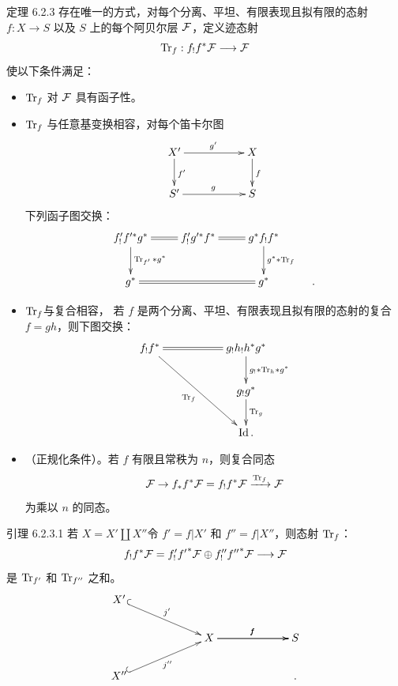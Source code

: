 \begin{enonce*}{定理 6.2.3}
存在唯一的方式，对每个分离、平坦、有限表现且拟有限的态射 $f:X\rightarrow S$
以及 $S$ 上的每个阿贝尔层 ${\mathcal F} $，定义迹态射
$$
\operatorname{Tr}_{f}:f_{!}f^{\ast}{\mathcal F} \longrightarrow {\mathcal F}
$$
使以下条件满足：
\begin{itemize}
\item[\textsuperscript{(Var 1)}] $\operatorname{Tr}_{f}$ 对 ${\mathcal F} $ 具有函子性。

\item[\textsuperscript{(Var 2)}] $\operatorname{Tr}_{f}$ 与任意基变换相容，\ie 对每个笛卡尔图
$$
\xymatrix{
X' \ar[rr]^{g'} \ar[d]^{f'}& & X\ar[d]^{f}\\
S' \ar[rr]^{g} & &  S
}
$$
下列函子图交换：
$$
\xymatrix{
f'_{!} f'^{\ast} g^{\ast} \ar@{=}[r] \ar[d]^{\Tr_{f'}\ast g^{\ast}}& f'_{!}g'^{\ast} f^{\ast}\ar@{=}[r] &
g^{\ast}f_{!}f^{\ast} \ar[d]^{g^{\ast}\ast
  \Tr_f}\\
g^{\ast} \ar@{=}[rr]&  & g^{\ast} &.
}
$$

\item[\textsuperscript{(Var 3)}] $\operatorname{Tr}_{f}$\pageoriginale 与复合相容，
\ie 若 $f$ 是两个分离、平坦、有限表现且拟有限的态射的复合 $f=gh$，则下图交换：
$$
\xymatrix{
f_{!}f^{\ast}\ar[rrdd]_{\Tr_f} \ar@{=}[rr]& & g_{!}h_{!} h^{\ast}g^{\ast}\ar[d]^{g_{!}\ast\mathord{\Tr_{h}}\ast g^\ast}\\
              & &  g_{!}g^{\ast} \ar[d]^{\Tr_g}\\
              & & \Id .
}
$$

\item[\textsuperscript{(Var 4)}] （正规化条件）。若 $f$ 有限且常秩为 $n$，则复合同态
$$
{\mathcal F} \rightarrow
f_{\ast}f^{\ast}{\mathcal F} =f_{!}f^{\ast}{\mathcal F} \xrightarrow{\operatorname{Tr}_{f}}{\mathcal F}
$$
为乘以 $n$ 的同态。
\end{itemize}
\end{enonce*}


\begin{enonce*}{引理 6.2.3.1}
若 $X=X'\amalg X''$令 $f'=f|X'$ 和 $f''=f|X''$，则态射 $\operatorname{Tr}_{f}$：
$$
f_{!}f^{\ast}{\mathcal F} =f'_{!}{f'}^{\ast}{\mathcal F} \oplus
f''_{!}{f''}^{\ast}{\mathcal F} \longrightarrow {\mathcal F}
$$
是 $\operatorname{Tr}_{f'}$ 和 $\operatorname{Tr}_{f''}$ 之和。
$$
\xymatrix@C=2.25cm@R=.75cm{
  X' \ar@{^{(}->}[rd]^{j'}&           &\\
   & X   \ar[r]^{f}  \ar[r]^{f}    & S\\
X'' \ar@{^{(}->}[ru]_{j''}& &.
}
$$
\end{enonce*}

